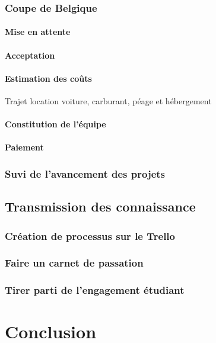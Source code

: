 \documentclass[12pt,a4paper]{report}
\begin{document}
    \subsection{Coupe de Belgique}
      \subsubsection{Mise en attente}
      \subsubsection{Acceptation}
      \subsubsection{Estimation des coûts}
        Trajet location voiture, carburant, péage et hébergement
      \subsubsection{Constitution de l'équipe}
      \subsubsection{Paiement}
    \subsection{Suvi de l'avancement des projets}

  \section{Transmission des connaissance}
    \subsection{Création de processus sur le Trello}
    \subsection{Faire un carnet de passation}
    \subsection{Tirer parti de l'engagement étudiant}

\chapter*{Conclusion}
\end{document}
